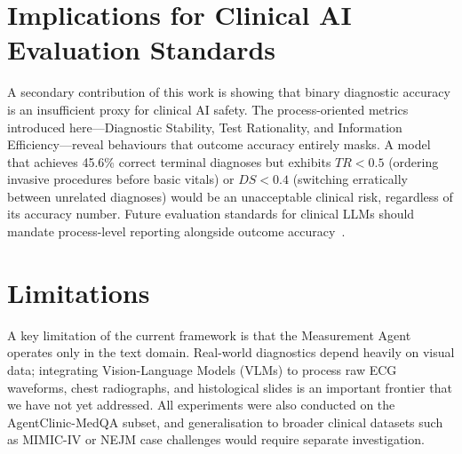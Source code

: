 \section{Implications for Clinical AI Evaluation Standards}

A secondary contribution of this work is showing that binary diagnostic accuracy is an insufficient proxy for clinical AI safety. The process-oriented metrics introduced here---Diagnostic Stability, Test Rationality, and Information Efficiency---reveal behaviours that outcome accuracy entirely masks. A model that achieves 45.6\% correct terminal diagnoses but exhibits $TR < 0.5$ (ordering invasive procedures before basic vitals) or $DS < 0.4$ (switching erratically between unrelated diagnoses) would be an unacceptable clinical risk, regardless of its accuracy number. Future evaluation standards for clinical LLMs should mandate process-level reporting alongside outcome accuracy~\cite{johri2023guidelines}.

\section{Limitations}

A key limitation of the current framework is that the Measurement Agent operates only in the text domain. Real-world diagnostics depend heavily on visual data; integrating Vision-Language Models (VLMs) to process raw ECG waveforms, chest radiographs, and histological slides is an important frontier that we have not yet addressed. All experiments were also conducted on the AgentClinic-MedQA subset, and generalisation to broader clinical datasets such as MIMIC-IV or NEJM case challenges would require separate investigation.
